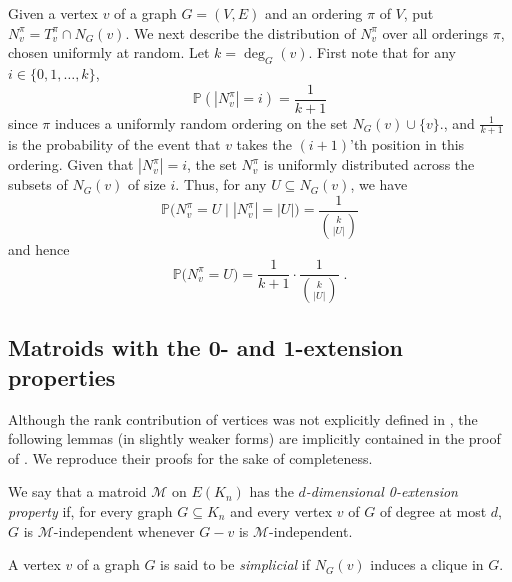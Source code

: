 \documentclass[11pt,a4paper]{article}
\theoremstyle{definition}
\newcommand{\cM}{\mathcal{M}}
\newcommand{\Prob}{\mathbb{P}}
\begin{document}
Given a vertex $v$ of a graph $G=(V,E)$ and an ordering   $\pi$ of $V$, put $N_v^\pi=T_v^\pi\cap N_G(v)$.
We next describe the distribution of $N_v^\pi$  over all  orderings $\pi$, chosen uniformly at random. Let $k=\deg_G(v)$. 
First note that for any $i\in\{0,1,\dots, k\}$, 
\begin{equation}\label{eq:b0}
\Prob(|N_v^\pi|=i)=\frac{1}{k+1}
\end{equation}
since $\pi$ induces a uniformly random ordering on the set $N_G(v)\cup\{v\}.$, and $\frac{1}{k+1}$ is the probability of the event that $v$ takes the $(i+1)$'th position in this ordering. 
Given that $|N_v^\pi|=i$, the set $N_v^\pi$ is uniformly distributed across the subsets of $N_G(v)$ of size $i$.  Thus, for any $U\subseteq N_G(v)$, we have $$\Prob\bigg(N_v^\pi=U \;\bigg|\; |N_v^\pi|=|U|\bigg)=\frac{1}{\binom{k}{|U|}} $$ and hence $$ \Prob\big(N_v^\pi=U\big)=\frac{1}{k+1}\cdot\frac{1}{\binom{k}{|U|}}\;.$$

\subsection*{Matroids with the 0- and 1-extension properties}

Although the rank contribution of vertices was not explicitly defined in \cite{vill}, the following lemmas (in slightly weaker forms) are {implicitly contained in the proof of 
\cite[Lemma 3.2]{vill}}. We reproduce their proofs for the sake of completeness. 



We say that a matroid $\cM$ on $E(K_n)$ has the {\em $d$-dimensional 0-extension property} if, for every graph $G\subseteq K_n$ and every vertex $v$ of $G$ of degree at most $d$, $G$ is $\cM$-independent whenever $G-v$ is $\cM$-independent.

A vertex $v$ of a graph $G$ is said to be {\em simplicial} if $N_G(v)$ induces a clique in $G$.
\end{document}
